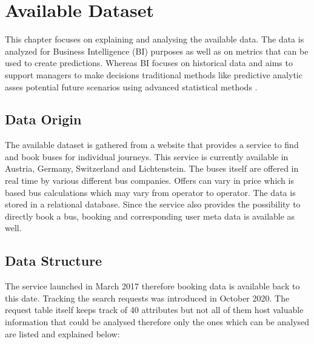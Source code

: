 %
%
% 
% 
% 

\chapter{Available Dataset}
\label{chap:available_dataset}
This chapter focuses on explaining and analysing the available data. The data is analyzed for Business Intelligence (BI) purposes as well as on metrics that can be used to create predictions. Whereas BI \cite{9325610} focuses on historical data and aims to support managers to make decisions traditional methods like predictive analytic asses potential future scenarios using advanced statistical methods \cite{9671997}.

\section{Data Origin}
The available dataset is gathered from a website that provides a service to find and book buses for individual journeys. This service is currently available in Austria, Germany, Switzerland and Lichtenstein. The buses itself are offered in real time by various different bus companies. Offers can vary in price which is based bus calculations which may vary from operator to operator. The data is stored in a relational database. Since the service also provides the possibility to directly book a bus, booking and corresponding user meta data is available as well. \newline




\section{Data Structure}
The service launched in March 2017 therefore booking data is available back to this date. Tracking the search requests was introduced in October 2020. 
The request table itself keeps track of 40 attributes but not all of them host valuable information that could be analysed therefore only the ones which can be analysed are listed and explained below:

